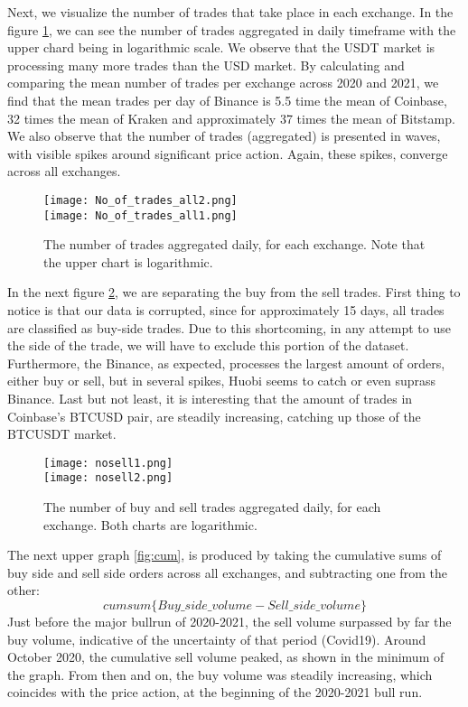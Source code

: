 Next, we visualize the number of trades that take place in each exchange. In the figure \ref{fig:nooftrades}, we can see the number of trades aggregated in daily timeframe with the upper chard being in logarithmic scale. We observe that the USDT market is processing many more trades than the USD market. By calculating and comparing the mean number of trades per exchange across 2020 and 2021, we find that the mean trades per day of Binance is 5.5 time the mean of Coinbase, 32 times the mean of Kraken and approximately 37 times the mean of Bitstamp. We also observe that the number of trades (aggregated) is presented in waves, with visible spikes around significant price action. Again, these spikes, converge across all exchanges.  

\begin{figure}[H]
	\centering
    \texttt{[image: No\_of\_trades\_all2.png]} \\
    \texttt{[image: No\_of\_trades\_all1.png]} \\ 
	\caption{The number of trades aggregated daily, for each exchange. Note that the upper chart is logarithmic.}
    \label{fig:nooftrades}
\end{figure}

In the next figure \ref{fig:nooftrades2}, we are separating the buy from the sell trades. First thing to notice is that our data is corrupted, since for approximately 15 days, all trades are classified as buy-side trades. Due to this shortcoming, in any attempt to use the side of the trade, we will have to exclude this portion of the dataset. Furthermore, the Binance, as expected, processes the largest amount of orders, either buy or sell, but in several spikes, Huobi seems to catch or even suprass Binance. Last but not least, it is interesting that the amount of trades in Coinbase's BTCUSD pair, are steadily increasing, catching up those of the BTCUSDT market.

\begin{figure}[H]
	\centering
    \texttt{[image: nosell1.png]} \\
    \texttt{[image: nosell2.png]} \\ 
	\caption{The number of buy and sell trades aggregated daily, for each exchange. Both charts are logarithmic.}
    \label{fig:nooftrades2}
\end{figure}


The next upper graph \ref{fig:cum}, is produced by taking the cumulative sums of buy side and sell side orders across all exchanges, and subtracting one from the other: 
\[ cumsum\{Buy\_side\_volume - Sell\_side\_volume\} \]
Just before the major bullrun of 2020-2021, the sell volume surpassed by far the buy volume, indicative of the uncertainty of that period (Covid19). Around October 2020, the cumulative sell volume peaked, as shown in the minimum of the graph. From then and on, the buy volume was steadily increasing, which coincides with the price action, at the beginning of the 2020-2021 bull run.  

